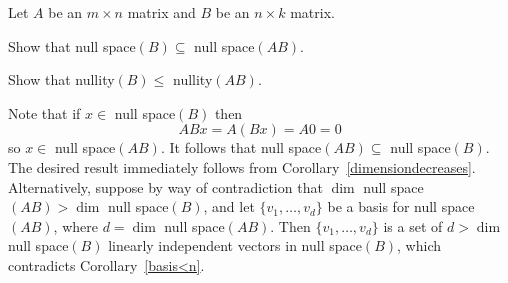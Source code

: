 \documentclass{ximera}
\begin{document}
\begin{exercise} \label{A5.6.2}
Let $A$ be an $m\times n$ matrix and $B$ be an $n\times k$ matrix. 
\begin{enumeratea}
\item Show that null space$(B) \subseteq$ null space$(AB)$.
\item Show that nullity$(B) \leq$ nullity$(AB)$.
\end{enumeratea}

\begin{solution}
\soln Note that if $x\in$ null space$(B)$ then 
\[
ABx=A(Bx)=A0=0
\]
so $x\in$ null space$(AB)$. It follows that null space$(AB)\subseteq$ null space$(B)$. The desired result immediately follows from Corollary~\ref{dimensiondecreases}. Alternatively, suppose by way of contradiction that $\dim$ null space$(AB)>\dim$ null space$(B)$, and let $\{v_1,\ldots,v_d\}$ be a basis for null space$(AB)$, where $d=\dim$ null space$(AB)$. Then $\{v_1,\ldots,v_d \}$ is a set of $d>\dim$ null space$(B)$ linearly independent vectors in null space$(B)$, which contradicts Corollary~\ref{basis<n}.
\end{solution}
\end{exercise}
\end{document}
